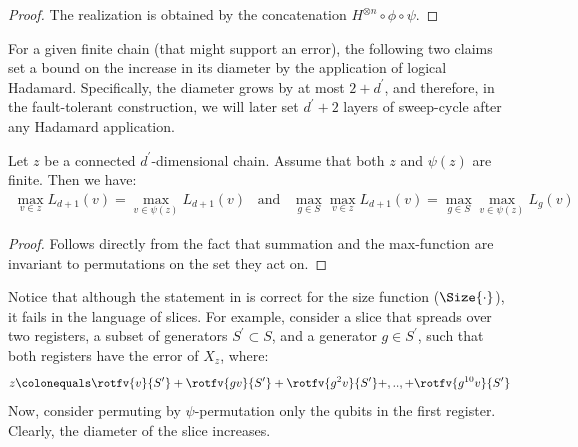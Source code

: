 \begin{proof}
  The realization is obtained by the concatenation $H^{\otimes n} \circ \phi \circ \psi$.
\end{proof}
For a given finite chain (that might support an error), the following two claims set a bound on the increase in its diameter by the application of logical Hadamard. Specifically, the diameter grows by at most $2 + d^{\prime}$, and therefore, in the fault-tolerant construction, we will later set $d^{\prime} + 2$ layers of sweep-cycle after any Hadamard application.
\begin{claim}
  \label{claim:invpar}
  Let $z$ be a connected $d^{\prime}$-dimensional chain. Assume that both $z$ and $\psi(z)$ are finite. Then we have:
  \begin{equation*}
    \begin{split}
      \max_{v \in z} L_{d+1}(v)  = \max_{v \in \psi(z)} L_{d+1}(v)  \, \, \, \text{   and   }  \, \, \, \max_{g\in S}\max_{v \in z} L_{d+1}(v)  = \max_{g\in S}\max_{v \in \psi(z)} L_{g}(v)
    \end{split}
  \end{equation*}
\end{claim}
\begin{proof}
Follows directly from the fact that summation and the max-function are invariant to permutations on the set they act on.
\end{proof}

\begin{remark}
  Notice that although the statement in  is correct for the size function ($\Size{\cdot}$), it fails in the language of slices. For example, consider a slice that spreads over two registers, a subset of generators $S^{\prime} \subset S$, and a generator $g \in S^{\prime}$, such that both registers have the error of $X_{z}$, where:
  \begin{equation*}
    \begin{split}
      z \colonequals \rotfv{v}{S^{\prime}}+ \rotfv{gv}{S^{\prime}} + \rotfv{g^{2}v}{S^{\prime}} + ,.., + \rotfv{g^{10}v}{S^{\prime}}
    \end{split}
  \end{equation*}
Now, consider permuting by $\psi$-permutation only the qubits in the first register. Clearly, the diameter of the slice increases.
\end{remark}

